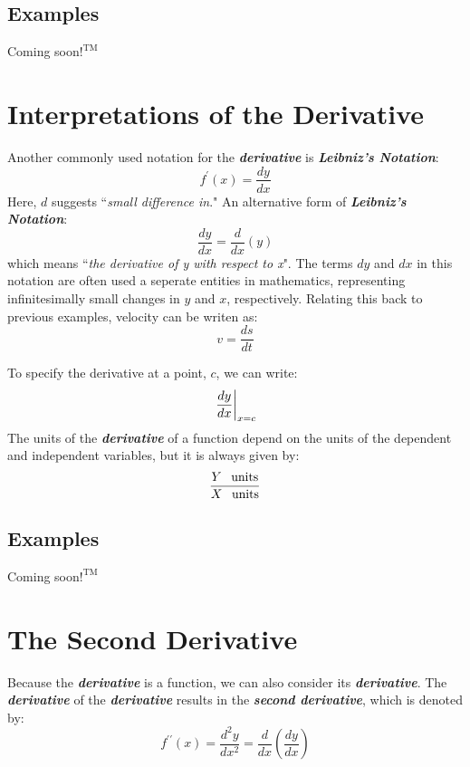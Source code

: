 \begin{center}
\section*{\small Examples}
Coming soon$!^{\text{TM}}$
\end{center}

\section{Interpretations of the Derivative}
Another commonly used notation for the \textbf{\textit{derivative}} is \textbf{\textit{Leibniz's Notation}}:
\begin{equation}
f^\prime(x) = \frac{dy}{dx}
\end{equation}
Here, $d$ suggests ``\textit{small difference in}." An alternative form of \textbf{\textit{Leibniz's Notation}}:
\begin{equation}
\frac{dy}{dx} = \frac{d}{dx}(y)
\end{equation}
which means ``\textit{the derivative of y with respect to x}". The terms $dy$ and $dx$ in this notation are often used a seperate entities in mathematics, representing infinitesimally small changes in $y$ and $x$, respectively. Relating this back to previous examples, velocity can be writen as:
\begin{equation}
v = \frac{ds}{dt}
\end{equation}

\vspace{0.1in}
To specify the derivative at a point, $c$, we can write:
\begin{equation}
\at{\frac{dy}{dx}}{x=c} %
\end{equation}
The units of the \textbf{\textit{derivative}} of a function depend on the units of the dependent and independent variables, but it is always given by:
\begin{equation}
\frac{Y\hphantom{-} \text{units}}{X\hphantom{-} \text{units}}
\end{equation}

\begin{center}
\section*{\small Examples}
Coming soon$!^{\text{TM}}$
\end{center}

\section{The Second Derivative}
Because the \textbf{\textit{derivative}} is a function, we can also consider its \textbf{\textit{derivative}}. The \textbf{\textit{derivative}} of the \textbf{\textit{derivative}} results in the \textbf{\textit{second derivative}}, which is denoted by:
\begin{equation}
\label{eq:second_deriv}
f^{\prime\prime}(x) = \frac{d^2 y}{dx^2} = \frac{d}{dx}\left(\frac{dy}{dx}\right)
\end{equation}

